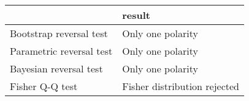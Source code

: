 \begin{tabular}{ll}
\toprule
{} &                        result \\
\midrule
Bootstrap reversal test  &             Only one polarity \\
Parametric reversal test &             Only one polarity \\
Bayesian reversal test   &             Only one polarity \\
Fisher Q-Q test          &  Fisher distribution rejected \\
\bottomrule
\end{tabular}
